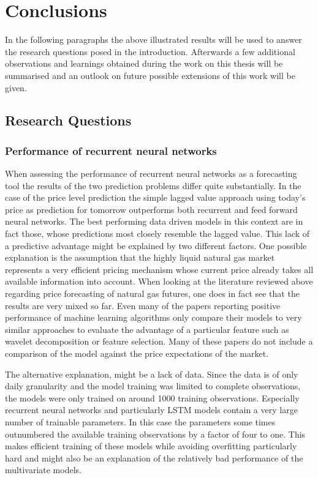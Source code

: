 \chapter{Conclusions}\label{Sec:Conc}
In the following paragraphs the above illustrated results will be used to answer the research questions posed in the introduction. Afterwards a few additional observations and learnings obtained during the work on this thesis will be summarised and an outlook on future possible extensions of this work will be given.
\section{Research Questions}
\subsection{Performance of recurrent neural networks}
When assessing the performance of recurrent neural networks as a forecasting tool the results of the two prediction problems differ quite substantially. In the case of the price level prediction the simple lagged value approach using today's price as prediction for tomorrow outperforms both recurrent and feed forward neural networks. The best performing data driven models in this context are in fact those, whose predictions most closely resemble the lagged value. This lack of a predictive advantage might be explained by two different factors. One possible explanation is the assumption that the highly liquid natural gas market represents a very efficient pricing mechanism whose current price already takes all available information into account. When looking at the literature reviewed above regarding price forecasting of natural gas futures, one does in fact see that the results are very mixed so far. Even many of the papers reporting positive performance of machine learning algorithms only compare their models to very similar approaches to evaluate the advantage of a particular feature such as wavelet decomposition or feature selection. Many of these papers do not include a comparison of the model against the price expectations of the market.

The alternative explanation, might be a lack of data. Since the data is of only daily granularity and the model training was limited to complete observations, the models were only trained on around 1000 training observations. Especially recurrent neural networks and particularly LSTM models contain a very large number of trainable parameters. In this case the parameters some times outnumbered the available training observations by a factor of four to one. This makes efficient training of these models while avoiding overfitting particularly hard and might also be an explanation of the relatively bad performance of the multivariate models. 

